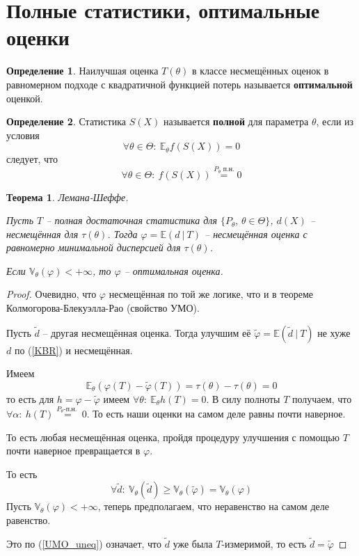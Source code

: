 \documentclass[a4paper,12pt]{article}
\renewcommand{\phi}{\ensuremath{\varphi}}
\renewcommand{\geq}{\ensuremath{\geqslant}}
\theoremstyle{plain}
\newtheorem{theorem}{Теорема}[section]
\theoremstyle{definition}
\newtheorem{definition}{Определение}[section]
\theoremstyle{remark}
\begin{document}
\section{Полные статистики, оптимальные оценки}
\begin{definition}
  Наилучшая оценка $T(\theta)$ в классе несмещённых оценок в равномерном подходе с квадратичной функцией потерь называется \textbf{оптимальной} оценкой.
\end{definition}

\begin{definition}
  Статистика $S(X)$ называется \textbf{полной} для параметра $\theta$, если из условия 
  \[
    \forall \theta \in \Theta :\: \mathbb{E}_\theta f(S(X)) = 0
  \]
  следует, что
  \[
    \forall \theta \in \Theta :\: f(S(X)) \overset{P_\theta\text{ п.н.}}{=} 0
  \]
\end{definition}

\begin{theorem}
  Лемана-Шеффе.

  Пусть $T$ -- полная достаточная статистика для $\{P_\theta,\, \theta \in \Theta\}$, $d(X)$ -- несмещённая для $\tau(\theta)$. Тогда $\phi = \mathbb{E}(d \:\vert\: T)$ -- несмещённая оценка с равномерно минимальной дисперсией для $\tau(\theta)$.

  Если $\mathbb{V}_\theta(\phi) < +\infty$, то $\phi$ -- оптимальная оценка.
\end{theorem}

\begin{proof}
  Очевидно, что $\phi$ несмещённая по той же логике, что и в теореме Колмогорова-Блекуэлла-Рао (свойство УМО).
  
  Пусть $\tilde{d}$ -- другая несмещённая оценка. Тогда улучшим её $\tilde{\phi} = \mathbb{E}(\tilde{d} \:\vert\: T)$ не хуже $d$ по (\ref{KBR}) и несмещённая.
  
  Имеем 
  \[
    \mathbb{E}_\theta(\phi(T) - \tilde{\phi}(T)) = \tau(\theta) - \tau(\theta) = 0
  \]
  то есть для $h = \phi - \tilde{\phi}$ имеем $\forall \theta :\: \mathbb{E}_\theta h(T) = 0$. В силу полноты $T$ получаем, что $\forall \alpha :\: h(T) \overset{P_\theta \text{-п.н. }}{=} 0$. То есть наши оценки на самом деле равны почти наверное.

  То есть любая несмещённая оценка, пройдя процедуру улучшения с помощью $T$ почти наверное превращается в $\phi$.

  То есть 
  \[
    \forall \tilde{d} :\: \mathbb{V}_\theta(\tilde{d}) \geq \mathbb{V}_\theta(\tilde{\phi}) = \mathbb{V}_\theta(\phi)
  \]
  Пусть $\mathbb{V}_\theta(\phi) < +\infty$, теперь предполагаем, что неравенство на самом деле равенство. 

  Это по (\ref{UMO_uneq}) означает, что $\tilde{d}$ уже была $T$-измеримой, то есть $\tilde{d} = \tilde{\phi}$
\end{proof}
\end{document}
